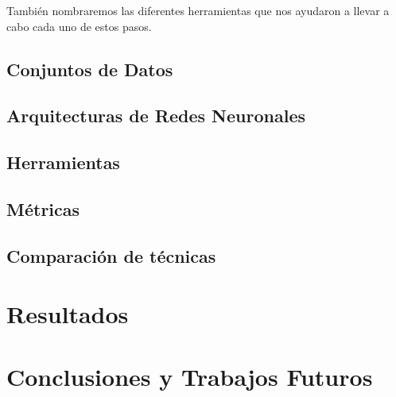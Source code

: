 \documentclass[a4paper,12pt,spanish]{book}
\begin{document}
También nombraremos las diferentes herramientas que nos ayudaron a llevar a cabo
cada uno de estos pasos.

\section{Conjuntos de Datos} \label{sec:datos}


\section{Arquitecturas de Redes Neuronales}


\section{Herramientas}


\section{Métricas} \label{sec:metricas}


\section{Comparación de técnicas} \label{sec:comparacion}


\chapter{Resultados} \label{sec:resultados}









\chapter{Conclusiones y Trabajos Futuros}


\newpage
\footnotesize
\nocite{python-docs}
\nocite{jupyter-docs}
\nocite{nabu}
\nocite{numpy-docs}
\nocite{pandas-docs}
\nocite{pytorch-docs}
\nocite{mlflow-docs}
\nocite{optuna-docs}
\printbibliography[heading=bibintoc]

\newpage
\newpage
\vfill
\addtocounter{page}{-1}
\clearpage
\thispagestyle{empty}
\phantom{a}
\vfill
\newpage
\vfill
\addtocounter{page}{-1}
\end{document}

